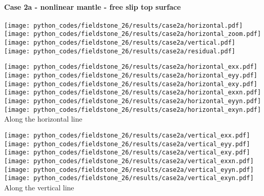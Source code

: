 \newpage
\paragraph{Case 2a - nonlinear mantle - free slip top surface} 

\begin{center}
\texttt{[image: python\_codes/fieldstone\_26/results/case2a/horizontal.pdf]}
\texttt{[image: python\_codes/fieldstone\_26/results/case2a/horizontal\_zoom.pdf]}\\
\texttt{[image: python\_codes/fieldstone\_26/results/case2a/vertical.pdf]}
\texttt{[image: python\_codes/fieldstone\_26/results/case2a/residual.pdf]}
\end{center}

\begin{center}
\texttt{[image: python\_codes/fieldstone\_26/results/case2a/horizontal\_exx.pdf]}
\texttt{[image: python\_codes/fieldstone\_26/results/case2a/horizontal\_eyy.pdf]}
\texttt{[image: python\_codes/fieldstone\_26/results/case2a/horizontal\_exy.pdf]}\\
\texttt{[image: python\_codes/fieldstone\_26/results/case2a/horizontal\_exxn.pdf]}
\texttt{[image: python\_codes/fieldstone\_26/results/case2a/horizontal\_eyyn.pdf]}
\texttt{[image: python\_codes/fieldstone\_26/results/case2a/horizontal\_exyn.pdf]}\\
{\captionfont Along the horizontal line}
\end{center}

\begin{center}
\texttt{[image: python\_codes/fieldstone\_26/results/case2a/vertical\_exx.pdf]}
\texttt{[image: python\_codes/fieldstone\_26/results/case2a/vertical\_eyy.pdf]}
\texttt{[image: python\_codes/fieldstone\_26/results/case2a/vertical\_exy.pdf]}\\
\texttt{[image: python\_codes/fieldstone\_26/results/case2a/vertical\_exxn.pdf]}
\texttt{[image: python\_codes/fieldstone\_26/results/case2a/vertical\_eyyn.pdf]}
\texttt{[image: python\_codes/fieldstone\_26/results/case2a/vertical\_exyn.pdf]}\\
{\captionfont Along the vertical line}
\end{center}






\newpage
